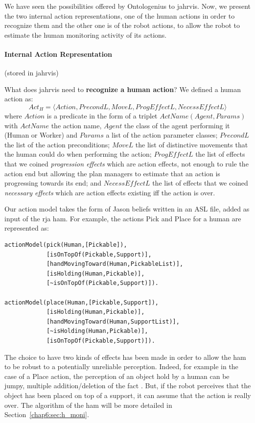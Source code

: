 \documentclass[a4paper,11pt,twoside]{StyleThese}
\begin{document}
We have seen the possibilities offered by Ontologenius to \acrshort{jahrvis}. Now, we present the two internal action representations, one of the human actions in order to recognize them and the other one is of the robot actions, to allow the robot to estimate the human monitoring activity of its actions. 

\paragraph{Internal Action Representation}\label{chap6:par:act_rep}(\ie stored in \acrshort{jahrvis})\mbox{}

\bigskip
What does \acrshort{jahrvis} need to \textbf{recognize a human action}? We defined a human action as: 
\[Act_H=\langle Action,PrecondL,MoveL,ProgEffectL,NecessEffectL\rangle\] where $Action$ is a predicate in the form of a triplet $ActName(Agent,Params)$ with $ActName$ the action name, $Agent$ the class of the agent performing it (\eg Human or Worker) and $Params$ a list of the action parameter classes; $PrecondL$ the list of the action preconditions; $MoveL$ the list of distinctive movements that the human could do when performing the action; $ProgEffectL$ the list of effects that we coined \textit{progression effects} which are action effects, not enough to rule the action end but allowing the plan managers to estimate that an action is progressing towards its end; and $NecessEffectL$ the list of effects that we coined \textit{necessary effects} which are action effects existing iff the action is over.

Our action model takes the form of Jason beliefs written in an ASL file, added as input of the \acrshort{rja} \acrlong{ham}. For example, the actions Pick and Place for a human are represented as:
\begin{lstlisting}[style=aslDef]
actionModel(pick(Human,[Pickable]),
			[isOnTopOf(Pickable,Support)],
			[handMovingToward(Human,PickableList)],
			[isHolding(Human,Pickable)],
			[~isOnTopOf(Pickable,Support)]).

actionModel(place(Human,[Pickable,Support]),
			[isHolding(Human,Pickable)],
			[handMovingToward(Human,SupportList)],
			[~isHolding(Human,Pickable)],
			[isOnTopOf(Pickable,Support)]).
\end{lstlisting}

The choice to have two kinds of effects has been made in order to allow the \acrlong{ham} to be robust to a potentially unreliable perception. Indeed, for example in the case of a Place action, the perception of an object hold by a human can be jumpy, multiple addition/deletion of the fact . But, if the robot perceives that the object has been placed on top of a support, it can assume that the action is really over. The algorithm of the \acrlong{ham} will be more detailed in Section~\ref{chap6:sec:h_moni}.
\end{document}
